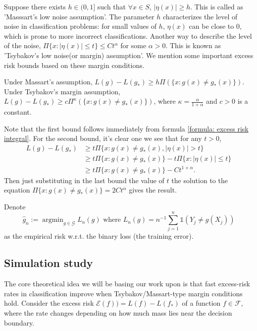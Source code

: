 Suppose there exists $h\in (0,1]$ such that $\forall x \in S$, $|\eta(x)|\ge h$. This is called as 'Masssart's low noise assumption'. The parameter $h$ characterizes the level of noise in classification problems: for small values of $h$, $\eta(x)$ can be close to $0$, which is prone to more incorrect classifications. Another way to describe the level of the noise, $\Pi\{x: |\eta(x)|\le t\}\le C t^\alpha$ for some $\alpha>0$. This is known as 'Tsybakov's low noise(or margin) assumption'.
We mention some important excess risk bounds based on these margin conditions.
\begin{lemma}\label{lemma: margin assumptions}
  Under Massart's assumption, $L(g)-L(g_*)\ge h\Pi(\{x:g(x)\neq g_*(x)\})$. Under Tsybakov's margin assumption, $L(g)-L(g_*)\ge c\Pi^\kappa(\{x:g(x)\neq g_*(x)\})$, where $\kappa= \frac{\alpha}{1+\alpha}$ and $c>0$ is a constant.
\end{lemma}
Note that the first bound follows immediately from formula \ref{formula: excess risk integral}. For the second bound, it's clear one we see that for any $t>0$,
\begin{align*}
  L(g)-L(g_*) & \ge t\Pi\{ x: g(x) \neq g_*(x),|\eta(x)|>t\}               \\
              & \ge t\Pi\{ x : g(x)\neq g_*(x)\}-t\Pi\{x: |\eta(x)|\le t\} \\
              & \ge t\Pi\{ x : g(x)\neq g_*(x)\}- C t^{1+\alpha}.
\end{align*}
Then just substituting in the last bound the value of $t$ the solution to the equation $\Pi\{x: g(x)\neq g_*(x) \}=2Ct^\alpha$ gives the result.

Denote
$$
  \hat{g}_n:= \operatorname{argmin}_{g \in \mathcal{G}} L_n(g) \text{ where } L_n(g)=n^{-1}\sum_{j=1}^n \mathds{1}(Y_j\neq g(X_j))
$$
as the empirical risk w.r.t. the binary loss (the training error).

\subsection{Simulation study}
The core theoretical idea we will be basing our work upon is that fast excess-risk rates in classification improve when Tsybakov/Massart-type margin conditions hold.
Consider the excess risk $\mathcal{E}(f))=L(f)-L(f_*)$ of a function $f\in \mathcal{F}$, where the rate changes depending on how much mass lies near the decision boundary.
